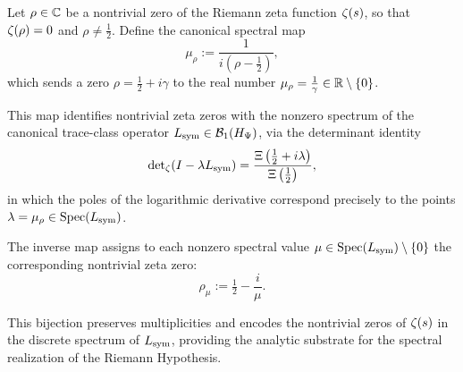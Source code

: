 \begin{definition}
\label{def:spectral_zero_map}
Let \( \rho \in \mathbb{C} \) be a nontrivial zero of the Riemann zeta function \( \zeta(s) \), so that \( \zeta(\rho) = 0 \) and \( \rho \ne \tfrac{1}{2} \). Define the canonical spectral map
\[
\mu_\rho := \frac{1}{i(\rho - \tfrac{1}{2})},
\]
which sends a zero \( \rho = \tfrac{1}{2} + i\gamma \) to the real number \( \mu_\rho = \frac{1}{\gamma} \in \mathbb{R} \setminus \{0\} \).

\medskip
\noindent
This map identifies nontrivial zeta zeros with the nonzero spectrum of the canonical trace-class operator \( L_{\mathrm{sym}} \in \mathcal{B}_1(H_{\Psi}) \), via the determinant identity
\[
\det\nolimits_\zeta(I - \lambda L_{\mathrm{sym}}) = \frac{\Xi\left(\tfrac{1}{2} + i\lambda\right)}{\Xi\left(\tfrac{1}{2}\right)},
\]
in which the poles of the logarithmic derivative correspond precisely to the points \( \lambda = \mu_\rho \in \operatorname{Spec}(L_{\mathrm{sym}}) \).

\medskip
\noindent
The inverse map assigns to each nonzero spectral value \( \mu \in \operatorname{Spec}(L_{\mathrm{sym}}) \setminus \{0\} \) the corresponding nontrivial zeta zero:
\[
\rho_\mu := \tfrac{1}{2} - \frac{i}{\mu}.
\]

\medskip
\noindent
This bijection preserves multiplicities and encodes the nontrivial zeros of \( \zeta(s) \) in the discrete spectrum of \( L_{\mathrm{sym}} \), providing the analytic substrate for the spectral realization of the Riemann Hypothesis.
\end{definition}
